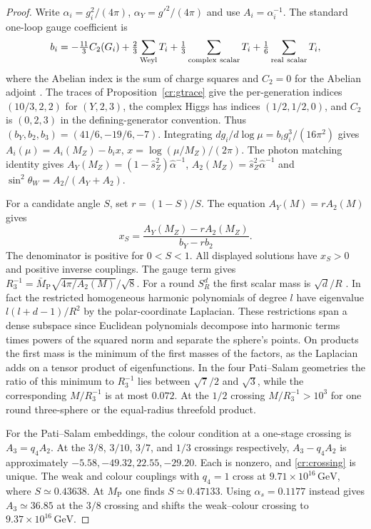 \documentclass[aps,pra,onecolumn,superscriptaddress,nofootinbib,10pt]{revtex4-2}
\theoremstyle{definition}
\theoremstyle{remark}
\begin{document}
\begin{proof}
Write $\alpha_i=g_i^2/(4\pi)$, $\alpha_Y=g'^2/(4\pi)$ and use
$A_i=\alpha_i^{-1}$. The standard one-loop gauge coefficient is
\[
 b_i=-\tfrac{11}{3}C_2(G_i)
   +\tfrac23\sum_{\rm Weyl}T_i
   +\tfrac13\sum_{\rm complex\ scalar}T_i
   +\tfrac16\sum_{\rm real\ scalar}T_i ,
\]
where the Abelian index is the sum of charge squares and
$C_2=0$ for the Abelian adjoint \cite{ub:mv83,GQW}.
The traces of Proposition~\ref{cr:gtrace} give the per-generation
indices $(10/3,2,2)$ for $(Y,2,3)$, the complex Higgs has
indices $(1/2,1/2,0)$, and $C_2$ is $(0,2,3)$
in the defining-generator convention. Thus
$(b_Y,b_2,b_3)=(41/6,-19/6,-7)$. Integrating
$d g_i/d\log\mu=b_i g_i^3/(16\pi^2)$ gives
$A_i(\mu)=A_i(M_Z)-b_i x$, $x=\log(\mu/M_Z)/(2\pi)$.
The photon matching identity gives
$A_Y(M_Z)=(1-\hat s_Z^2)\hat\alpha^{-1}$,
$A_2(M_Z)=\hat s_Z^2\hat\alpha^{-1}$ and
$\sin^2\theta_W=A_2/(A_Y+A_2)$.

For a candidate angle $S$, set $r=(1-S)/S$. The equation
$A_Y(M)=r A_2(M)$ gives
\begin{equation}\label{cr:crossing}
 x_S=\frac{A_Y(M_Z)-rA_2(M_Z)}{b_Y-r b_2}.
\end{equation}
The denominator is positive for $0<S<1$. All displayed solutions
have $x_S>0$ and positive inverse couplings. The gauge term gives
$R_3^{-1}=\bar M_{\mathrm P}\sqrt{4\pi/A_2(M)}/\sqrt8$.
For a round $S^d_R$ the first scalar mass is $\sqrt d/R$
\cite[Ch.~III, sphere spectrum]{cr:chavel}. In fact the restricted
homogeneous harmonic polynomials of degree $l$ have eigenvalue
$l(l+d-1)/R^2$ by the polar-coordinate Laplacian. These
restrictions span a dense subspace since Euclidean polynomials
decompose into harmonic terms times powers of the squared norm
and separate the sphere's points. On products the first mass
is the minimum of the first masses of the factors, as the
Laplacian adds on a tensor product of eigenfunctions. In the
four Pati--Salam geometries the ratio of this minimum to
$R_3^{-1}$ lies between $\sqrt7/2$ and $\sqrt3$, while the
corresponding $M/R_3^{-1}$ is at most $0.072$.
At the $1/2$ crossing $M/R_3^{-1}>10^3$ for one round
three-sphere or the equal-radius threefold product.

For the Pati--Salam embeddings, the colour condition at a
one-stage crossing is $A_3=q_4 A_2$. At the $3/8$, $3/10$,
$3/7$, and $1/3$ crossings respectively,
$A_3-q_4A_2$ is approximately $-5.58,-49.32,22.55,-29.20$.
Each is nonzero, and \eqref{cr:crossing} is unique. The weak
and colour couplings with $q_4=1$ cross at
$9.71\times10^{16}\,\mathrm{GeV}$, where $S\simeq0.43638$.
At $M_{\mathrm P}$ one finds $S\simeq0.47133$.
Using $\alpha_s=0.1177$ instead gives
$A_3\simeq36.85$ at the $3/8$ crossing and shifts the weak--colour
crossing to $9.37\times10^{16}\,\mathrm{GeV}$.
\end{proof}
\end{document}
